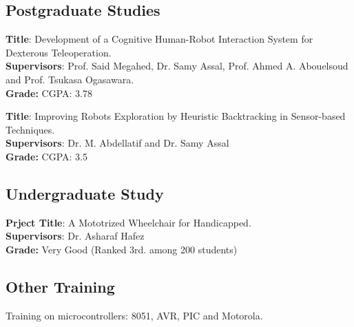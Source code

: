 \documentclass[
  a4paper, 
   maincolor=cvblue,
   sectioncolor=cvblue,
]{fortysecondscv}
\begin{document}
\subsection{Postgraduate Studies}
\begin{cvtable}
		{\textbf{Title}: Development of a Cognitive Human-Robot Interaction System for Dexterous Teleoperation.\\
		\textbf{Supervisors}: Prof. Said Megahed, Dr. Samy Assal, Prof. Ahmed A. Abouelsoud and Prof. Tsukasa Ogasawara.\\
		\textbf{Grade: }CGPA: 3.78\\
		   }
		
		{\textbf{Title}: Improving Robots Exploration by Heuristic Backtracking in Sensor-based Techniques.\\
		\textbf{Supervisors}: Dr. M. Abdellatif and Dr. Samy Assal\\
		\textbf{Grade: }CGPA: 3.5\\
	   }
\end{cvtable}


\subsection{Undergraduate Study}
\begin{cvtable}
		{\textbf{Prject Title}: A Mototrized Wheelchair for Handicapped.\\
		\textbf{Supervisors}: Dr. Asharaf Hafez\\
		\textbf{Grade: } Very Good (Ranked 3rd. among 200 students)}
	\end{cvtable}

\subsection{Other Training}
\begin{cvtable}
		{Training on microcontrollers: 8051, AVR, PIC and Motorola.}
	\end{cvtable}
	
\end{document}

